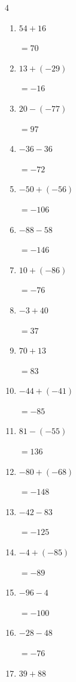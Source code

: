 \begin{multicols}{4}
\begin{enumerate}
        $=-90$

  \item $54+16$

        $=70$

  \item $13+(-29)$

        $=-16$

  \item $20-(-77)$

        $=97$

  \item $-36-36$

        $=-72$

  \item $-50+(-56)$

        $=-106$

  \item $-88-58$

        $=-146$

  \item $10+(-86)$

        $=-76$

  \item $-3+40$

        $=37$

  \item $70+13$

        $=83$

  \item $-44+(-41)$

        $=-85$

  \item $81-(-55)$

        $=136$

\columnbreak %

  \item $-80+(-68)$

        $=-148$

  \item $-42-83$

        $=-125$

  \item $-4+(-85)$

        $=-89$

  \item $-96-4$

        $=-100$

  \item $-28-48$

        $=-76$

  \item $39+88$


\end{enumerate}
\end{multicols}
